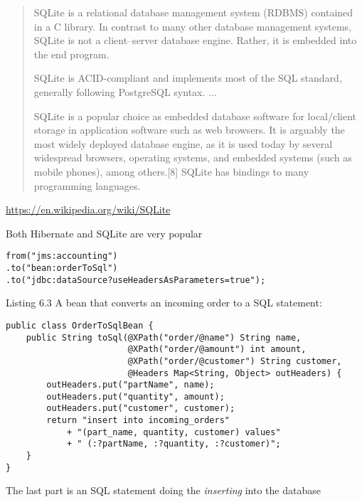 \documentclass[Screen16to9,17pt]{foils}
\begin{document}
\begin{quote}
  SQLite is a relational database management system (RDBMS) contained in a C library. In contrast to many other database management systems, SQLite is not a client–server database engine. Rather, it is embedded into the end program.

SQLite is ACID-compliant and implements most of the SQL standard, generally following PostgreSQL syntax. ...

SQLite is a popular choice as embedded database software for local/client storage in application software such as web browsers. It is arguably the most widely deployed database engine, as it is used today by several widespread browsers, operating systems, and embedded systems (such as mobile phones), among others.[8] SQLite has bindings to many programming languages.
\end{quote}

\url{https://en.wikipedia.org/wiki/SQLite}

Both Hibernate and SQLite are very popular




\begin{verbatim}
from("jms:accounting")
.to("bean:orderToSql")
.to("jdbc:dataSource?useHeadersAsParameters=true");
\end{verbatim}


Listing 6.3   A bean that converts an incoming order to a SQL statement:
\begin{verbatim}
public class OrderToSqlBean {
    public String toSql(@XPath("order/@name") String name,
                        @XPath("order/@amount") int amount,
                        @XPath("order/@customer") String customer,
                        @Headers Map<String, Object> outHeaders) {
        outHeaders.put("partName", name);
        outHeaders.put("quantity", amount);
        outHeaders.put("customer", customer);
        return "insert into incoming_orders"
            + "(part_name, quantity, customer) values"
            + " (:?partName, :?quantity, :?customer)";
    }
}
\end{verbatim}

The last part is an SQL statement doing the \emph{inserting} into the database

\end{document}
